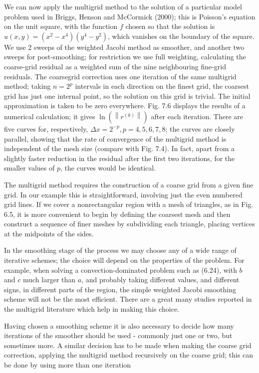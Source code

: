 \documentclass[10pt]{article}
\begin{document}
We can now apply the multigrid method to the solution of a particular model problem used in Briggs, Henson and McCormick (2000); this is Poisson's equation on the unit square, with the function \(f\) chosen so that the solution is \(u(x, y)=\left(x^{2}-x^{4}\right)\left(y^{4}-y^{2}\right)\), which vanishes on the boundary of the square. We use 2 sweeps of the weighted Jacobi method as smoother, and another two sweeps for post-smoothing; for restriction we use full weighting, calculating the coarse-grid residual as a weighted sum of the nine neighbouring fine-grid residuals. The coarsegrid correction uses one iteration of the same multigrid method; taking \(n=2^{p}\) intervals in each direction on the finest grid, the coarsest grid has just one internal point, so the solution on this grid is trivial. The initial approximation is taken to be zero everywhere. Fig. 7.6 displays the results of a numerical calculation; it gives \(\ln \left(\left\|r^{(k)}\right\|\right)\) after each iteration. There are five curves for, respectively, \(\Delta x=2^{-p}, p=4,5,6,7,8\); the curves are closely parallel, showing that the rate of convergence of the multigrid method is independent of the mesh size (compare with Fig. 7.4). In fact, apart from a slightly faster reduction in the residual after the first two iterations, for the smaller values of \(p\), the curves would be identical.

The multigrid method requires the construction of a coarse grid from a given fine grid. In our example this is straightforward, involving just the even numbered grid lines. If we cover a nonrectangular region with a mesh of triangles, as in Fig. 6.5, it is more convenient to begin by defining the coarsest mesh and then construct a sequence of finer meshes by subdividing each triangle, placing vertices at the midpoints of the sides.

In the smoothing stage of the process we may choose any of a wide range of iterative schemes; the choice will depend on the properties of the problem. For example, when solving a convection-dominated problem such as (6.24), with \(b\) and \(c\) much larger than \(a\), and probably taking different values, and different signs, in different parts of the region, the simple weighted Jacobi smoothing scheme will not be the most efficient. There are a great many studies reported in the multigrid literature which help in making this choice.

Having chosen a smoothing scheme it is also necessary to decide how many iterations of the smoother should be used - commonly just one or two, but sometimes more. A similar decision has to be made when making the coarse grid correction, applying the multigrid method recursively on the coarse grid; this can be done by using more than one iteration
\end{document}
